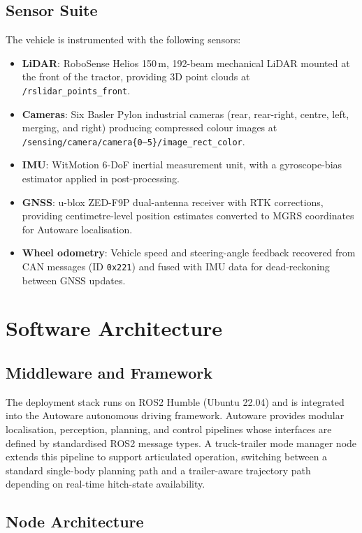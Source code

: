\subsection{Sensor Suite}

The vehicle is instrumented with the following sensors:

\begin{itemize}
    \item \textbf{LiDAR}: RoboSense Helios 150\,m, 192-beam mechanical LiDAR mounted at the front of the tractor, providing 3D point clouds at \texttt{/rslidar\_points\_front}.
    \item \textbf{Cameras}: Six Basler Pylon industrial cameras (rear, rear-right, centre, left, merging, and right) producing compressed colour images at \texttt{/sensing/camera/camera\{0--5\}/image\_rect\_color}.
    \item \textbf{IMU}: WitMotion 6-DoF inertial measurement unit, with a gyroscope-bias estimator applied in post-processing.
    \item \textbf{GNSS}: u-blox ZED-F9P dual-antenna receiver with RTK corrections, providing centimetre-level position estimates converted to MGRS coordinates for Autoware localisation.
    \item \textbf{Wheel odometry}: Vehicle speed and steering-angle feedback recovered from CAN messages (ID \texttt{0x221}) and fused with IMU data for dead-reckoning between GNSS updates.
\end{itemize}

\section{Software Architecture}

\subsection{Middleware and Framework}

The deployment stack runs on ROS2 Humble (Ubuntu 22.04) and is integrated into the Autoware autonomous driving framework. Autoware provides modular localisation, perception, planning, and control pipelines whose interfaces are defined by standardised ROS2 message types. A truck-trailer mode manager node extends this pipeline to support articulated operation, switching between a standard single-body planning path and a trailer-aware trajectory path depending on real-time hitch-state availability.

\subsection{Node Architecture}

